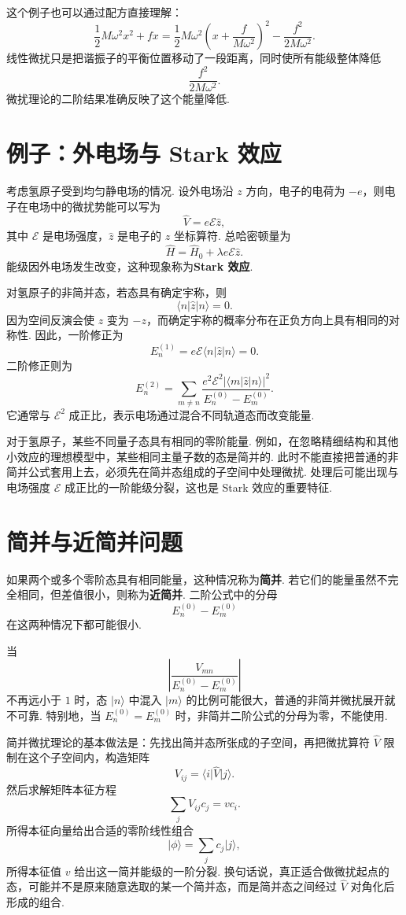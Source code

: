 \documentclass[UTF8,11pt,a4paper,openany]{ctexbook}
\newcommand{\ket}[1]{\lvert #1\rangle}\newcommand{\bra}[1]{\langle #1\rvert}
\newcommand{\term}[1]{\textbf{#1}}
\begin{document}
这个例子也可以通过配方直接理解：
\[
\frac12M\omega^2x^2+fx
=
\frac12M\omega^2
\left(x+\frac{f}{M\omega^2}\right)^2
-\frac{f^2}{2M\omega^2}.
\]
线性微扰只是把谐振子的平衡位置移动了一段距离，同时使所有能级整体降低
\[
\frac{f^2}{2M\omega^2}.
\]
微扰理论的二阶结果准确反映了这个能量降低. 

\section{例子：外电场与 Stark 效应}

考虑氢原子受到均匀静电场的情况. 设外电场沿 $z$ 方向，电子的电荷为 $-e$，则电子在电场中的微扰势能可以写为
\[
\hat V=e\mathcal E\hat z,
\]
其中 $\mathcal E$ 是电场强度，$\hat z$ 是电子的 $z$ 坐标算符. 总哈密顿量为
\[
\hat H=\hat H_0+\lambda e\mathcal E\hat z.
\]
能级因外电场发生改变，这种现象称为\term{Stark 效应}. 

对氢原子的非简并态，若态具有确定宇称，则
\[
\bra n\hat z\ket n=0.
\]
因为空间反演会使 $z$ 变为 $-z$，而确定宇称的概率分布在正负方向上具有相同的对称性. 因此，一阶修正为
\[
E_n^{(1)}=e\mathcal E\bra n\hat z\ket n=0.
\]
二阶修正则为
\[
E_n^{(2)}
=
\sum_{m\ne n}
\frac{
e^2\mathcal E^2
\left|\bra m\hat z\ket n\right|^2
}
{E_n^{(0)}-E_m^{(0)}}.
\]
它通常与 $\mathcal E^2$ 成正比，表示电场通过混合不同轨道态而改变能量. 

对于氢原子，某些不同量子态具有相同的零阶能量. 例如，在忽略精细结构和其他小效应的理想模型中，某些相同主量子数的态是简并的. 此时不能直接把普通的非简并公式套用上去，必须先在简并态组成的子空间中处理微扰. 处理后可能出现与电场强度 $\mathcal E$ 成正比的一阶能级分裂，这也是 Stark 效应的重要特征. 

\section{简并与近简并问题}

如果两个或多个零阶态具有相同能量，这种情况称为\term{简并}. 若它们的能量虽然不完全相同，但差值很小，则称为\term{近简并}. 二阶公式中的分母
\[
E_n^{(0)}-E_m^{(0)}
\]
在这两种情况下都可能很小. 

\begin{limitbox}
当
\[
\left|
\frac{V_{mn}}
{E_n^{(0)}-E_m^{(0)}}
\right|
\]
不再远小于 $1$ 时，态 $\ket n$ 中混入 $\ket m$ 的比例可能很大，普通的非简并微扰展开就不可靠. 特别地，当 $E_n^{(0)}=E_m^{(0)}$ 时，非简并二阶公式的分母为零，不能使用. 
\end{limitbox}

简并微扰理论的基本做法是：先找出简并态所张成的子空间，再把微扰算符 $\hat V$ 限制在这个子空间内，构造矩阵
\[
V_{ij}=\bra i\hat V\ket j.
\]
然后求解矩阵本征方程
\[
\sum_jV_{ij}c_j=v c_i.
\]
所得本征向量给出合适的零阶线性组合
\[
\ket{\phi}=\sum_jc_j\ket j,
\]
所得本征值 $v$ 给出这一简并能级的一阶分裂. 换句话说，真正适合做微扰起点的态，可能并不是原来随意选取的某一个简并态，而是简并态之间经过 $\hat V$ 对角化后形成的组合. 
\end{document}

